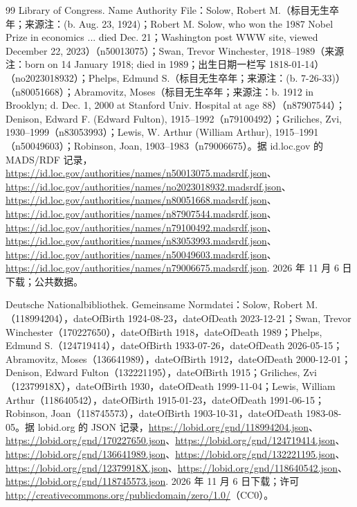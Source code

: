 \begin{thebibliography}{99}
 Library of Congress. Name Authority File：Solow, Robert M.（标目无生卒年；来源注：(b. Aug. 23, 1924)；Robert M. Solow, who won the 1987 Nobel Prize in economics ... died Dec. 21；Washington post WWW site, viewed December 22, 2023）（n50013075）；Swan, Trevor Winchester, 1918--1989（来源注：born on 14 January 1918; died in 1989；出生日期一栏写 1818-01-14）（no2023018932）；Phelps, Edmund S.（标目无生卒年；来源注：(b. 7-26-33)）（n80051668）；Abramovitz, Moses（标目无生卒年；来源注：b. 1912 in Brooklyn; d. Dec. 1, 2000 at Stanford Univ. Hospital at age 88）（n87907544）；Denison, Edward F. (Edward Fulton), 1915--1992（n79100492）；Griliches, Zvi, 1930--1999（n83053993）；Lewis, W. Arthur (William Arthur), 1915--1991（n50049603）；Robinson, Joan, 1903--1983（n79006675）。据 id.loc.gov 的 MADS/RDF 记录，\url{https://id.loc.gov/authorities/names/n50013075.madsrdf.json}、\url{https://id.loc.gov/authorities/names/no2023018932.madsrdf.json}、\url{https://id.loc.gov/authorities/names/n80051668.madsrdf.json}、\url{https://id.loc.gov/authorities/names/n87907544.madsrdf.json}、\url{https://id.loc.gov/authorities/names/n79100492.madsrdf.json}、\url{https://id.loc.gov/authorities/names/n83053993.madsrdf.json}、\url{https://id.loc.gov/authorities/names/n50049603.madsrdf.json}、\url{https://id.loc.gov/authorities/names/n79006675.madsrdf.json}. 2026 年 11 月 6 日下载；公共数据。

 Deutsche Nationalbibliothek. Gemeinsame Normdatei：Solow, Robert M.（118994204），dateOfBirth 1924-08-23，dateOfDeath 2023-12-21；Swan, Trevor Winchester（170227650），dateOfBirth 1918，dateOfDeath 1989；Phelps, Edmund S.（124719414），dateOfBirth 1933-07-26，dateOfDeath 2026-05-15；Abramovitz, Moses（136641989），dateOfBirth 1912，dateOfDeath 2000-12-01；Denison, Edward Fulton（132221195），dateOfBirth 1915；Griliches, Zvi（12379918X），dateOfBirth 1930，dateOfDeath 1999-11-04；Lewis, William Arthur（118640542），dateOfBirth 1915-01-23，dateOfDeath 1991-06-15；Robinson, Joan（118745573），dateOfBirth 1903-10-31，dateOfDeath 1983-08-05。据 lobid.org 的 JSON 记录，\url{https://lobid.org/gnd/118994204.json}、\url{https://lobid.org/gnd/170227650.json}、\url{https://lobid.org/gnd/124719414.json}、\url{https://lobid.org/gnd/136641989.json}、\url{https://lobid.org/gnd/132221195.json}、\url{https://lobid.org/gnd/12379918X.json}、\url{https://lobid.org/gnd/118640542.json}、\url{https://lobid.org/gnd/118745573.json}. 2026 年 11 月 6 日下载；许可 \url{http://creativecommons.org/publicdomain/zero/1.0/}（CC0）。


\end{thebibliography}

